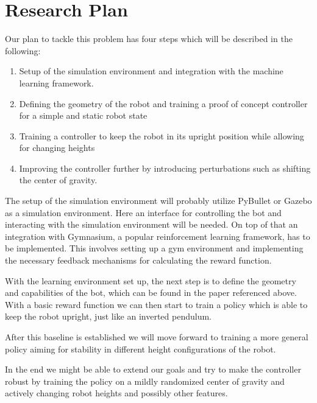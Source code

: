 \documentclass[a4paper]{article}
\begin{document}
\section{Research Plan}
Our plan to tackle this problem has four steps which will be described in the following:
\begin{enumerate}
  \item Setup of the simulation environment and integration with the machine learning framework.
  \item Defining the geometry of the robot and training a proof of concept controller for a simple
        and static robot state
  \item Training a controller to keep the robot in its upright position while allowing for changing heights
  \item Improving the controller further by introducing perturbations such as shifting the center of
        gravity.
\end{enumerate}

The setup of the simulation environment will probably utilize PyBullet or Gazebo as a simulation
environment. Here an interface for controlling the bot and interacting with the simulation environment
will be needed. On top of that an integration with Gymnasium, a popular reinforcement learning
framework, has to be implemented. This involves setting up a gym environment and implementing the necessary
feedback mechanisms for calculating the reward function.

With the learning environment set up, the next step is to define the geometry and capabilities of the
bot, which can be found in the paper referenced above. With a basic reward function we can then start
to train a policy which is able to keep the robot upright, just like an inverted pendulum.

After this baseline is established we will move forward to training a more general policy aiming for
stability in different height configurations of the robot.

In the end we might be able to extend our goals and try to make the controller robust by training
the policy on a mildly randomized center of gravity and actively changing robot heights and possibly
other features.
\end{document}
